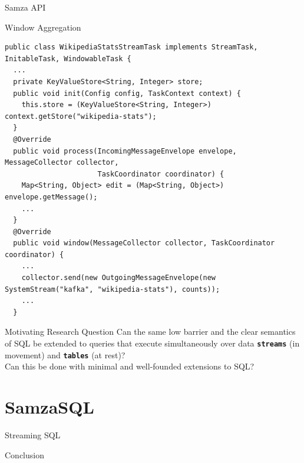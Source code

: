 \documentclass[newPxFont]{beamer}
\begin{document}
\begin{frame}[fragile]{Samza API}
\begin{exampleblock}{Window Aggregation}
\begin{verbatim}
public class WikipediaStatsStreamTask implements StreamTask, InitableTask, WindowableTask {
  ...
  private KeyValueStore<String, Integer> store;
  public void init(Config config, TaskContext context) {
    this.store = (KeyValueStore<String, Integer>) context.getStore("wikipedia-stats");
  }
  @Override
  public void process(IncomingMessageEnvelope envelope, MessageCollector collector, 
                      TaskCoordinator coordinator) {
    Map<String, Object> edit = (Map<String, Object>) envelope.getMessage();
    ...
  }
  @Override
  public void window(MessageCollector collector, TaskCoordinator coordinator) {
    ...
    collector.send(new OutgoingMessageEnvelope(new SystemStream("kafka", "wikipedia-stats"), counts));
    ...
  }
\end{verbatim}
\end{exampleblock}

\end{frame}


\begin{frame}{Motivating Research Question}
\Large{Can the same low barrier and the clear semantics of SQL be extended to queries that execute simultaneously over data \texttt{\textbf{streams}} (in movement) and \texttt{\textbf{tables}} (at rest)?} \\

\Large{Can this be done with minimal and well-founded extensions to SQL?}
\end{frame}
%
%

\section{SamzaSQL}


\begin{frame}[c]{Streaming SQL}

\end{frame}




%
%

\begin{frame}{Conclusion}

\end{frame}
\end{document}
